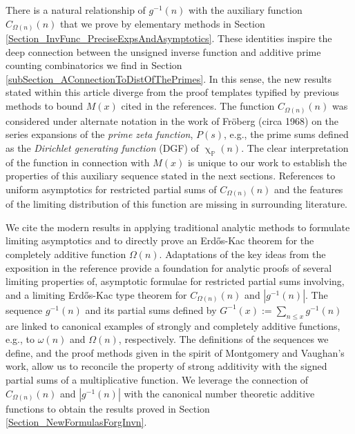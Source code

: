 \documentclass[11pt,reqno,a4letter]{article}
\numberwithin{figure}{section}
\numberwithin{table}{section}
\renewcommand{\chi}{\upchi}
\theoremstyle{plain}
\numberwithin{theorem}{section}
\theoremstyle{definition}
\begin{document}
There is a natural relationship of $g^{-1}(n)$ with the auxiliary function 
$C_{\Omega(n)}(n)$ that we prove by elementary methods in 
Section \ref{Section_InvFunc_PreciseExpsAndAsymptotics}. 
These identities inspire the deep connection between the 
unsigned inverse function and additive prime counting combinatorics we find in 
Section \ref{subSection_AConnectionToDistOfThePrimes}. 
In this sense, the new results stated within this article diverge from the proof 
templates typified by previous methods to bound $M(x)$ cited in the references. 
The function $C_{\Omega(n)}(n)$ was considered under alternate notation 
in the work of Fr\"oberg (circa 1968) on the series expansions of the 
\emph{prime zeta function}, $P(s)$, 
e.g., the prime sums defined as the 
\emph{Dirichlet generating function} (DGF) of $\chi_{\mathbb{P}}(n)$. 
The clear interpretation of the function in connection with $M(x)$ 
is unique to our work to establish the 
properties of this auxiliary sequence stated in the next sections. 
References to uniform asymptotics for restricted partial sums of 
$C_{\Omega(n)}(n)$ and the features of the limiting distribution 
of this function are missing in surrounding literature. 

We cite the modern results in \cite[\S 7.4; \S 2.4]{MV} 
applying traditional analytic methods to formulate limiting asymptotics and to 
directly prove an Erd\H{o}s-Kac theorem for the completely additive 
function $\Omega(n)$. Adaptations of the key ideas 
from the exposition in the reference 
provide a foundation for analytic proofs of several limiting 
properties of, asymptotic formulae for restricted partial sums involving, and a 
limiting Erd\H{o}s-Kac type theorem for 
$C_{\Omega(n)}(n)$ and $|g^{-1}(n)|$. 
The sequence $g^{-1}(n)$ and its partial sums defined by 
$G^{-1}(x) := \sum_{n \leq x} g^{-1}(n)$ are linked to 
canonical examples of strongly and completely additive functions, 
e.g., to $\omega(n)$ and $\Omega(n)$, respectively. 
The definitions of the sequences we define, and the 
proof methods given in the spirit of Montgomery and Vaughan's work, 
allow us to reconcile the property of strong additivity with the signed 
partial sums of a multiplicative function. 
We leverage the connection of $C_{\Omega(n)}(n)$ and $|g^{-1}(n)|$ with the 
canonical number theoretic additive functions to obtain the results proved 
in Section \ref{Section_NewFormulasForgInvn}. 
\end{document}
